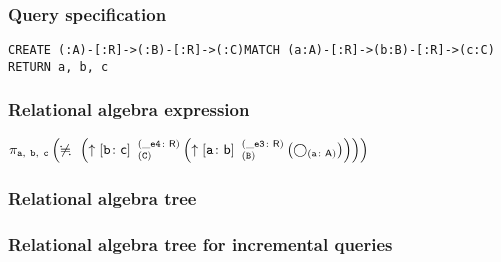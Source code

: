 \subsubsection*{Query specification}

\begin{lstlisting}
CREATE (:A)-[:R]->(:B)-[:R]->(:C)MATCH (a:A)-[:R]->(b:B)-[:R]->(c:C)
RETURN a, b, c
\end{lstlisting}

\subsubsection*{Relational algebra expression}

$\projection{\var{a},~\var{b},~\var{c}} \left(\alldifferent{} \left(\expandout{b}{c}{C}{\_e4}{R} \left(\expandout{a}{b}{B}{\_e3}{R} \left(\getvertices{a}{A}\right)\right)\right)\right)$

\subsubsection*{Relational algebra tree}


\subsubsection*{Relational algebra tree for incremental queries}


